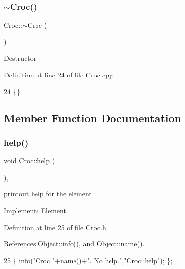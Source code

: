 \subsubsection{\texorpdfstring{$\sim$\+Croc()}{~Croc()}}
{\footnotesize\ttfamily Croc\+::$\sim$\+Croc (\begin{DoxyParamCaption}{ }\end{DoxyParamCaption})\hspace{0.3cm}{\ttfamily [virtual]}}



Destructor. 



Definition at line 24 of file Croc.\+cpp.


\begin{DoxyCode}
24 \{\} 
\end{DoxyCode}


\subsection{Member Function Documentation}
\mbox{\label{classCroc_a21195cea3b5ba13f90397cc8faa52633}} 
\subsubsection{\texorpdfstring{help()}{help()}}
{\footnotesize\ttfamily void Croc\+::help (\begin{DoxyParamCaption}{ }\end{DoxyParamCaption})\hspace{0.3cm}{\ttfamily [inline]}, {\ttfamily [virtual]}}

printout help for the element 

Implements \hyperlink{classElement_a32c0de27acb08e17251cef88c3e9303a}{Element}.



Definition at line 25 of file Croc.\+h.



References Object\+::info(), and Object\+::name().


\begin{DoxyCode}
25 \{ \hyperlink{classObject_a644fd329ea4cb85f54fa6846484b84a8}{info}(\textcolor{stringliteral}{"Croc "}+\hyperlink{classObject_a300f4c05dd468c7bb8b3c968868443c1}{name}()+\textcolor{stringliteral}{". No help."},\textcolor{stringliteral}{"Croc::help"}); \};
\end{DoxyCode}
\mbox{\label{classCroc_a0ccc2406507c081f637a4d0346494f09}} 
